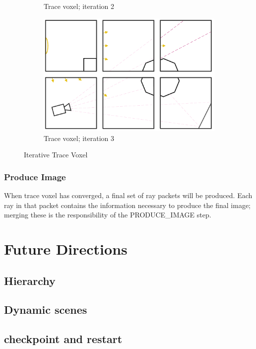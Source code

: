 \documentclass{vgtc}                          %
\begin{document}
\begin{figure}[!htb]
\begin{subfigure}{.49\columnwidth}
  \caption{Trace voxel; iteration 2}
\end{subfigure}
\begin{subfigure}{.49\columnwidth}
 \centering
  \includegraphics[width=.98\columnwidth]{drawings/Trace4.pdf}
  \caption{Trace voxel; iteration 3}
\end{subfigure}
\caption{Iterative Trace Voxel}
\label{fig:trace}
\end{figure}

\subsubsection{Produce Image}
When trace voxel has converged, a final set of ray packets will be produced.  Each ray in that packet contains the information necessary to produce the final image; merging these is the responsibility of the PRODUCE\_IMAGE step.  

\section{Future Directions}

\subsection{Hierarchy}

\subsection{Dynamic scenes}

\subsection{checkpoint and restart} 
\end{document}

